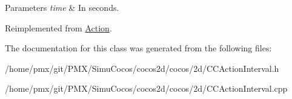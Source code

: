 \begin{DoxyParams}{Parameters}
{\em time} & In seconds. \\
\hline
\end{DoxyParams}


Reimplemented from \hyperlink{classAction_a937e646e63915e33ad05ba149bfcf239}{Action}.



The documentation for this class was generated from the following files\+:\begin{DoxyCompactItemize}
\item 
/home/pmx/git/\+P\+M\+X/\+Simu\+Cocos/cocos2d/cocos/2d/C\+C\+Action\+Interval.\+h\item 
/home/pmx/git/\+P\+M\+X/\+Simu\+Cocos/cocos2d/cocos/2d/C\+C\+Action\+Interval.\+cpp\end{DoxyCompactItemize}

